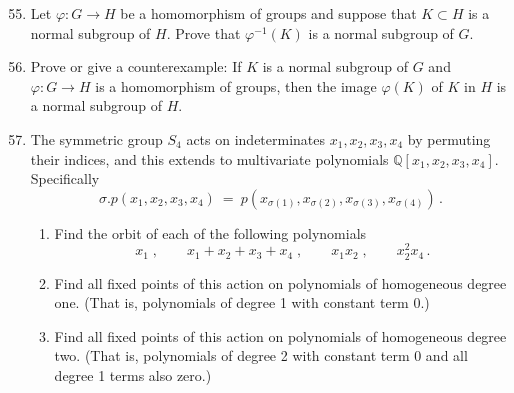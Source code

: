 \documentclass[12pt]{article}
\newcommand{\QQ}{{\mathbb Q}}
\begin{document}
\begin{enumerate}
\setcounter{enumi}{54}


\item
  Let $\varphi\colon G \to H$ be a homomorphism of groups and suppose that $K\subset H$ is a normal subgroup of $H$.
  Prove that $\varphi^{-1}(K)$ is a normal subgroup of $G$.


\item
  Prove or give a counterexample:  If $K$ is a normal subgroup of $G$ and $\varphi\colon G \to H$ is a homomorphism of
  groups,  then the image $\varphi(K)$ of $K$ in $H$ is a normal subgroup of $H$.


\item
  The symmetric group $S_4$ acts on indeterminates $x_1,x_2,x_3,x_4$ by permuting their indices, and
  this extends to multivariate polynomials $\QQ[x_1,x_2,x_3,x_4]$.
  Specifically
  \[
  \sigma.p(x_1,x_2,x_3,x_4)\ =\ p(x_{\sigma(1)},x_{\sigma(2)},x_{\sigma(3)},x_{\sigma(4)})\,.
  \]
  \begin{enumerate}
  \item
    Find the orbit of each of the following polynomials
    \[
    x_1\;, \qquad x_1+x_2+x_3+x_4\;, \qquad x_1x_2\;, \qquad x_2^2 x_4\,.
    \]
  \item
    Find all fixed points of this action on polynomials of homogeneous degree one.  (That is, polynomials of degree 1 with constant term 0.)
  \item
    Find all fixed points of this action on polynomials of homogeneous degree two.  (That is, polynomials of degree 2 with constant term
    0 and all degree 1 terms also zero.)
  \end{enumerate}


\end{enumerate}
\end{document}
